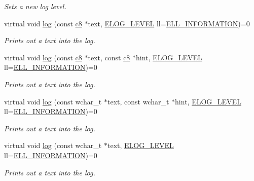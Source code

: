 \begin{DoxyCompactItemize}
\begin{DoxyCompactList}\small\item\em Sets a new log level. \end{DoxyCompactList}\item 
virtual void \hyperlink{classirr_1_1ILogger_acbbc214a06cd968409000f55aa76c82f}{log} (const \hyperlink{namespaceirr_a9395eaea339bcb546b319e9c96bf7410}{c8} $\ast$text, \hyperlink{namespaceirr_aa2d1cac68606a25ed24cfffccfa30a92}{E\+L\+O\+G\+\_\+\+L\+E\+V\+EL} ll=\hyperlink{namespaceirr_aa2d1cac68606a25ed24cfffccfa30a92aaed3e0f449ad8851a1bb501d4df1c0e7}{E\+L\+L\+\_\+\+I\+N\+F\+O\+R\+M\+A\+T\+I\+ON})=0
\begin{DoxyCompactList}\small\item\em Prints out a text into the log. \end{DoxyCompactList}\item 
virtual void \hyperlink{classirr_1_1ILogger_afccb7b2bb0a9b0415204d63e2b0cf290}{log} (const \hyperlink{namespaceirr_a9395eaea339bcb546b319e9c96bf7410}{c8} $\ast$text, const \hyperlink{namespaceirr_a9395eaea339bcb546b319e9c96bf7410}{c8} $\ast$hint, \hyperlink{namespaceirr_aa2d1cac68606a25ed24cfffccfa30a92}{E\+L\+O\+G\+\_\+\+L\+E\+V\+EL} ll=\hyperlink{namespaceirr_aa2d1cac68606a25ed24cfffccfa30a92aaed3e0f449ad8851a1bb501d4df1c0e7}{E\+L\+L\+\_\+\+I\+N\+F\+O\+R\+M\+A\+T\+I\+ON})=0
\begin{DoxyCompactList}\small\item\em Prints out a text into the log. \end{DoxyCompactList}\item 
virtual void \hyperlink{classirr_1_1ILogger_aeef998619135d81205d2fd488d4a69b1}{log} (const wchar\+\_\+t $\ast$text, const wchar\+\_\+t $\ast$hint, \hyperlink{namespaceirr_aa2d1cac68606a25ed24cfffccfa30a92}{E\+L\+O\+G\+\_\+\+L\+E\+V\+EL} ll=\hyperlink{namespaceirr_aa2d1cac68606a25ed24cfffccfa30a92aaed3e0f449ad8851a1bb501d4df1c0e7}{E\+L\+L\+\_\+\+I\+N\+F\+O\+R\+M\+A\+T\+I\+ON})=0
\begin{DoxyCompactList}\small\item\em Prints out a text into the log. \end{DoxyCompactList}\item 
virtual void \hyperlink{classirr_1_1ILogger_a40af57afdc28c5e890920cb448663ff9}{log} (const wchar\+\_\+t $\ast$text, \hyperlink{namespaceirr_aa2d1cac68606a25ed24cfffccfa30a92}{E\+L\+O\+G\+\_\+\+L\+E\+V\+EL} ll=\hyperlink{namespaceirr_aa2d1cac68606a25ed24cfffccfa30a92aaed3e0f449ad8851a1bb501d4df1c0e7}{E\+L\+L\+\_\+\+I\+N\+F\+O\+R\+M\+A\+T\+I\+ON})=0
\begin{DoxyCompactList}\small\item\em Prints out a text into the log. \end{DoxyCompactList}\end{DoxyCompactItemize}
